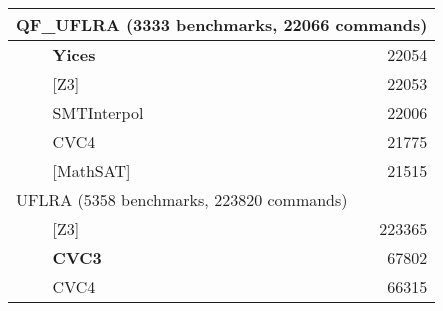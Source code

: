\begin{tabular}{|p{.1in}l|r|}
\hline
\hline
\multicolumn{3}{|l|}{QF\_UFLRA (3333 benchmarks, 22066 commands)} \\
\hline
& \textbf{Yices} & 22054 \\
& [Z3] & 22053 \\
& SMTInterpol & 22006 \\
& CVC4 & 21775 \\
& [MathSAT] & 21515 \\
\hline
\hline
\multicolumn{3}{|l|}{UFLRA (5358 benchmarks, 223820 commands)} \\
\hline
& [Z3] & 223365 \\
& \textbf{CVC3} & 67802 \\
& CVC4 & 66315 \\
\hline
\end{tabular}
